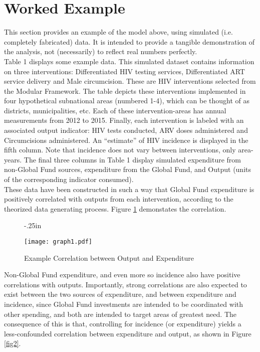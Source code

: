 \documentclass[twocolumn]{bmcart}%
\begin{document}
\clearpage


\section{Worked Example}


This section provides an example of the model above, using simulated (i.e. completely fabricated) data. It is intended to provide a tangible demonstration of the analysis, not (necessarily) to reflect real numbers perfectly. \\

Table 1 displays some example data. This simulated dataset contains information on three interventions: Differentiated HIV testing services, Differentiated ART service delivery and Male circumcision. These are HIV interventions selected from the Modular Framework. The table depicts these interventions implemented in four hypothetical subnational areas (numbered 1-4), which can be thought of as districts, municipalities, etc. Each of these intervention-areas has annual measurements from 2012 to 2015. Finally, each intervention is labeled with  an associated output indicator: HIV tests conducted, ARV doses administered and Circumcisions administered. An ``estimate'' of HIV incidence is displayed in the fifth column. Note that incidence does not vary between interventions, only area-years. The final three columns in Table 1 display simulated expenditure from non-Global Fund sources, expenditure from the Global Fund, and Output (units of the corresponding indicator consumed). \\

These data have been constructed in such a way that Global Fund expenditure is positively correlated with outputs from each intervention, according to the theorized data generating process. Figure \ref{fig1} demonstates the correlation. \\

\begin{figure}[h]
  \advance\leftskip-.25in
  \caption{\textmd{Example Correlation between Output and Expenditure}}
  \texttt{[image: graph1.pdf]} \\
  \label{fig1}
\end{figure}

Non-Global Fund expenditure, and even more so incidence also have positive correlations with outputs. Importantly, strong correlations are also expected to exist between the two sources of expenditure, and between expenditure and incidence, since Global Fund investments are intended to be coordinated with other spending, and both are intended to target areas of greatest need. The consequence of this is that, controlling for incidence (or expenditure) yields a less-confounded correlation between expenditure and output, as shown in Figure \ref{fig2}.
\end{document}
